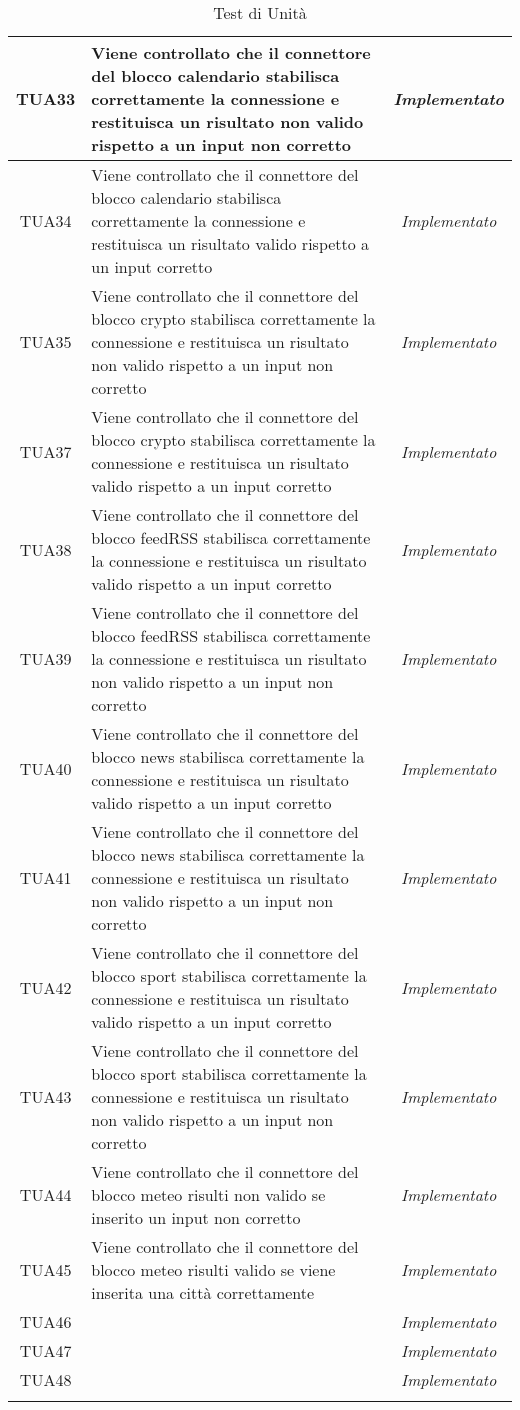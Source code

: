 \begin{longtable}{|c|m{12em}|c|}
TUA33 & Viene controllato che il connettore del blocco calendario stabilisca correttamente la connessione e restituisca un risultato non valido rispetto a un input non corretto& \textit{Implementato}\\ \hline
TUA34 & Viene controllato che il connettore del blocco calendario stabilisca correttamente la connessione e restituisca un risultato valido rispetto a un input corretto& \textit{Implementato}\\ \hline
TUA35 & Viene controllato che il connettore del blocco crypto stabilisca correttamente la connessione e restituisca un risultato non valido rispetto a un input non corretto& \textit{Implementato}\\ \hline
TUA37 & Viene controllato che il connettore del blocco crypto stabilisca correttamente la connessione e restituisca un risultato valido rispetto a un input corretto& \textit{Implementato}\\ \hline
TUA38 & Viene controllato che il connettore del blocco feedRSS stabilisca correttamente la connessione e restituisca un risultato valido rispetto a un input corretto& \textit{Implementato}\\ \hline
TUA39 & Viene controllato che il connettore del blocco feedRSS stabilisca correttamente la connessione e restituisca un risultato non valido rispetto a un input non corretto& \textit{Implementato}\\ \hline
TUA40 & Viene controllato che il connettore del blocco news stabilisca correttamente la connessione e restituisca un risultato valido rispetto a un input corretto& \textit{Implementato}\\ \hline
TUA41 & Viene controllato che il connettore del blocco news stabilisca correttamente la connessione e restituisca un risultato non valido rispetto a un input non corretto& \textit{Implementato}\\ \hline
TUA42 & Viene controllato che il connettore del blocco sport stabilisca correttamente la connessione e restituisca un risultato valido rispetto a un input corretto& \textit{Implementato}\\ \hline
TUA43 &  Viene controllato che il connettore del blocco sport stabilisca correttamente la connessione e restituisca un risultato non valido rispetto a un input non corretto& \textit{Implementato}\\ \hline
TUA44 & Viene controllato che il connettore del blocco meteo risulti non valido se inserito un input non corretto& \textit{Implementato}\\ \hline
TUA45 &  Viene controllato che il connettore del blocco meteo risulti valido se viene inserita una città correttamente& \textit{Implementato}\\ \hline
TUA46 & & \textit{Implementato}\\ \hline
TUA47 & & \textit{Implementato}\\ \hline
TUA48 & & \textit{Implementato}\\ \hline


\caption[Test di Unità]{Test di Unità}
\label{tabella:test2}
\end{longtable}
\clearpage

